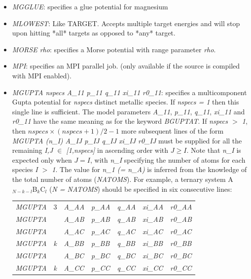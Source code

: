 \documentclass[12pt,a4paper,dvips]{article}
\begin{document}
\begin{itemize}
\item {\it MGGLUE\/}: specifies a glue potential for magnesium

\item {\it MLOWEST\/}: Like TARGET. Accepts multiple target energies and will stop upon hitting *all* targets as opposed to *any* target.

\item {\it MORSE rho\/}: specifies a Morse potential 
with range parameter {\it rho\/}.\cite{braierbw90,doyewb95,doyew96a}

\item {\it MPI\/}: specifies an MPI parallel job.
(only available if the source is compiled with MPI enabled).  

\item {\it MGUPTA nspecs A\_11 p\_11 q\_11 xi\_11 r0\_11\/}: specifies a multicomponent Gupta potential for {\it nspecs} distinct metallic species. If {\it nspecs = 1\/} then this single line is sufficient. The model parameters {\it A\_11\/}, {\it p\_11\/}, {\it q\_11\/}, {\it xi\_11\/} and {\it r0\_11\/} have the same meaning as for the keyword {\it BGUPTAT\/}. If {\it nspecs $>$ 1\/}, then $ nspecs \times (nspecs + 1)/2 - 1$ more subsequent lines of the form {\it MGUPTA (n\_I) A\_IJ p\_IJ q\_IJ xi\_IJ r0\_IJ \/} must be supplied for all the remaining {\it I,J $\in$ [1,nspecs] \/} in ascending order with $J \geq I$. Note that {\it n\_I\/} is expected only when $J = I$, with {\it n\_I\/} specifying the number of atoms for each species {\it I $>$ 1\/}. The value for {\it n\_1 (= n\_A)\/} is inferred from the knowledge of the total number of atoms ({\it NATOMS\/}). For example, a ternary system A$_{N-k-l}$B$_{k}$C$_{l}$  ({\it N = NATOMS\/}) should be specified in six consecutive lines: \\
\begin{tabular}{lllllll}
{\it MGUPTA} & 3 & {\it A\_AA} & {\it p\_AA} & {\it q\_AA} & {\it xi\_AA} & {\it r0\_AA} \\
{\it MGUPTA} &   & {\it A\_AB} & {\it p\_AB} & {\it q\_AB} & {\it xi\_AB} & {\it r0\_AB} \\
{\it MGUPTA} &   & {\it A\_AC} & {\it p\_AC} & {\it q\_AC} & {\it xi\_AC} & {\it r0\_AC} \\
{\it MGUPTA} & {\it k} & {\it A\_BB} & {\it p\_BB} & {\it q\_BB} & {\it xi\_BB} & {\it r0\_BB} \\
{\it MGUPTA} &   & {\it A\_BC} & {\it p\_BC} & {\it q\_BC} & {\it xi\_BC} & {\it r0\_BC} \\
{\it MGUPTA} & {\it k} & {\it A\_CC} & {\it p\_CC} & {\it q\_CC} & {\it xi\_CC} & {\it r0\_CC} \\
\end{tabular}


\end{itemize}
\end{document}

